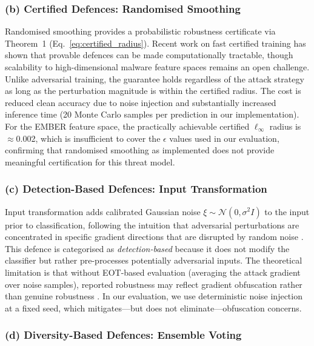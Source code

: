 \documentclass[conference]{IEEEtran}
\begin{document}
\subsubsection{(b) Certified Defences: Randomised Smoothing}

Randomised smoothing \cite{cohen2019} provides a probabilistic robustness certificate via Theorem~1 (Eq.~\ref{eq:certified_radius}). Recent work on fast certified training \cite{wong2020} has shown that provable defences can be made computationally tractable, though scalability to high-dimensional malware feature spaces remains an open challenge. Unlike adversarial training, the guarantee holds regardless of the attack strategy as long as the perturbation magnitude is within the certified radius. The cost is reduced clean accuracy due to noise injection and substantially increased inference time (20 Monte Carlo samples per prediction in our implementation). For the EMBER feature space, the practically achievable certified $\ell_\infty$ radius is $\approx$0.002, which is insufficient to cover the $\epsilon$ values used in our evaluation, confirming that randomised smoothing as implemented does not provide meaningful certification for this threat model.

\subsubsection{(c) Detection-Based Defences: Input Transformation}

Input transformation adds calibrated Gaussian noise $\xi \sim \mathcal{N}(0, \sigma^2 I)$ to the input prior to classification, following the intuition that adversarial perturbations are concentrated in specific gradient directions that are disrupted by random noise \cite{athalye2018}. This defence is categorised as \emph{detection-based} because it does not modify the classifier but rather pre-processes potentially adversarial inputs. The theoretical limitation is that without EOT-based evaluation (averaging the attack gradient over noise samples), reported robustness may reflect gradient obfuscation rather than genuine robustness \cite{athalye2018}. In our evaluation, we use deterministic noise injection at a fixed seed, which mitigates---but does not eliminate---obfuscation concerns.

\subsubsection{(d) Diversity-Based Defences: Ensemble Voting}
\end{document}
